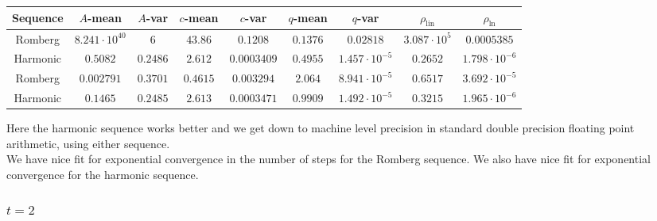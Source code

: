 \begin{table}[H]
    \centering
    \small
    \begin{tabular}{c||c|c|c|c|c|c|c|c}
Sequence & \(A\)-mean & \(A\)-var & \(c\)-mean & \(c\)-var & \(q\)-mean & \(q\)-var & \(\rho_{\operatorname{lin}}\) & \(\rho_{\ln}\)\\\hline
\rowcolor{red}
Romberg & \(8.241\cdot 10^{40}\) & \(6\) & \(43.86\) & \(0.1208\) & \(0.1376\) & \(0.02818\) & \(3.087\cdot 10^5\) & \(0.0005385\) \\
\rowcolor{green}
Harmonic & \(0.5082\) & \(0.2486\) & \(2.612\) & \(0.0003409\) & \(0.4955\) & \(1.457\cdot 10^{-5}\) & \(0.2652\) & \(1.798\cdot 10^{-6}\) \\
\rowcolor{green}
Romberg & \(0.002791\) & \(0.3701\) & \(0.4615\) & \(0.003294\) & \(2.064\) & \(8.941\cdot 10^{-5}\) & \(0.6517\) & \(3.692\cdot 10^{-5}\) \\
\rowcolor{green}
Harmonic & \(0.1465\) & \(0.2485\) & \(2.613\) & \(0.0003471\) & \(0.9909\) & \(1.492\cdot 10^{-5}\) & \(0.3215\) & \(1.965 \cdot 10^{-6}\) \\
    \end{tabular}
    \label{tab:my_label}
\end{table}

Here the harmonic sequence works better and we get down to machine level precision in standard double precision floating point arithmetic, using either sequence.\\

We have nice fit for exponential convergence in the number of steps for the Romberg sequence. We also have nice fit for exponential convergence for the harmonic sequence.

\subsubsection{\(t = 2\)}

